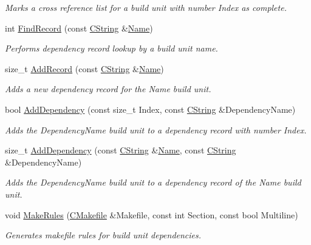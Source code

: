 \begin{DoxyCompactItemize}
\begin{DoxyCompactList}\small\item\em Marks a cross reference list for a build unit with number {\itshape Index} as complete. \end{DoxyCompactList}\item 
int \hyperlink{classCDependencyInfo_ab3c71dc1906f859133771b4228b61c8e}{Find\-Record} (const \hyperlink{classCString}{C\-String} \&\hyperlink{classCDependencyInfo_abd5a916dfc975667d25d9216d15a3ccf}{Name})
\begin{DoxyCompactList}\small\item\em Performs dependency record lookup by a build unit name. \end{DoxyCompactList}\item 
size\-\_\-t \hyperlink{classCDependencyInfo_aae74e0642e410f1f2364908a6030f410}{Add\-Record} (const \hyperlink{classCString}{C\-String} \&\hyperlink{classCDependencyInfo_abd5a916dfc975667d25d9216d15a3ccf}{Name})
\begin{DoxyCompactList}\small\item\em Adds a new dependency record for the {\itshape Name} build unit. \end{DoxyCompactList}\item 
bool \hyperlink{classCDependencyInfo_aeee41f5696f9e0952d0bb8cef3adf311}{Add\-Dependency} (const size\-\_\-t Index, const \hyperlink{classCString}{C\-String} \&Dependency\-Name)
\begin{DoxyCompactList}\small\item\em Adds the {\itshape Dependency\-Name} build unit to a dependency record with number {\itshape Index}. \end{DoxyCompactList}\item 
size\-\_\-t \hyperlink{classCDependencyInfo_a927accf24328efc443082b1cf967a01a}{Add\-Dependency} (const \hyperlink{classCString}{C\-String} \&\hyperlink{classCDependencyInfo_abd5a916dfc975667d25d9216d15a3ccf}{Name}, const \hyperlink{classCString}{C\-String} \&Dependency\-Name)
\begin{DoxyCompactList}\small\item\em Adds the {\itshape Dependency\-Name} build unit to a dependency record of the {\itshape Name} build unit. \end{DoxyCompactList}\item 
void \hyperlink{classCDependencyInfo_a076227951bd7f5e01db97e6e40eb5955}{Make\-Rules} (\hyperlink{classCMakefile}{C\-Makefile} \&Makefile, const int Section, const bool Multiline)
\begin{DoxyCompactList}\small\item\em Generates makefile rules for build unit dependencies. \end{DoxyCompactList}\item 

\end{DoxyCompactItemize}

